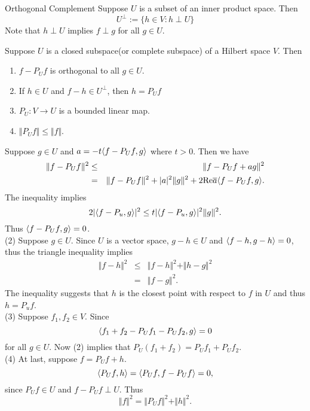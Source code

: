 \begin{sdefinition}{Orthogonal Complement}{}
Suppose $U$ is a subset of an inner product space. Then
$$
U^{\perp} := \{ h\in V:h \perp U\}
$$
Note that $h \perp U$ implies $f\perp g $ for all $g\in U$.
\end{sdefinition}

\begin{stheorem}{}{}
Suppose $U$ is a closed subspace(or complete subspace) of a Hilbert space $V$. Then \begin{enumerate}
	\item $f-P_Uf$ is orthogonal to all $g \in U$.
	\item If $h \in U$ and $f-h \in U^\perp$, then $h=P_Uf$
	\item $P_U: V \to U$ is a bounded linear map. 
	\item $\Vert P_Uf\Vert\leq \Vert f\Vert$.
\end{enumerate}	
\end{stheorem}
\begin{Proof}
Suppose $g\in U$ and $a=-t{\langle f-P_Uf,g\rangle}$ where $t>0$. Then we have
\begin{eqnarray*}
	\Vert f-P_Uf\Vert^2 &\leq & \Vert f - P_Uf +a g\Vert^2 \\
	&=& \Vert f-P_Uf \Vert^2 + |a|^2\Vert g\Vert^2 + 2\mathrm{Re} \overline{a} {\langle f-P_Uf,g\rangle}.
\end{eqnarray*}
The inequality implies 
$$
2|{\langle f-P_u,g\rangle}|^2 \leq t |{\langle f-P_u,g\rangle}|^2 \Vert g\Vert^2.
$$
Thus ${\langle f-P_Uf,g\rangle}=0$. \\
(2) Suppose $g \in U$. Since $U$ is a vector space, $g-h \in U$ and ${\langle f-h,g-h\rangle}=0$, thus the triangle inequality implies 
\begin{eqnarray*}
	\Vert f -h \Vert^2 &\leq&  \Vert f -h \Vert^2 + \Vert h-g \Vert^2 \\
	&=& \Vert f-g \Vert^2.
\end{eqnarray*}
The inequality suggests that $h$ is the closest point with respect to $f$ in $U$ and thus $h=P_uf$. \\
(3) Suppose $f_1,f_2 \in V$. Since
$$
{\langle f_1+f_2-P_Uf_1-P_Uf_2,g\rangle}=0
$$ 
for all $g \in U$. Now (2) implies that $P_U(f_1+f_2)=P_Uf_1+P_Uf_2$. \\
(4) At last, suppose $f=P_Uf + h$.
$$
{\langle P_Uf,h\rangle} = {\langle P_Uf,f-P_Uf\rangle}=0,
$$
since $P_Uf\in U$ and $f-P_Uf \perp U$. Thus 
$$
\Vert f\Vert^2 = \Vert P_Uf \Vert^2 + \Vert h \Vert^2. 
$$
\end{Proof}


